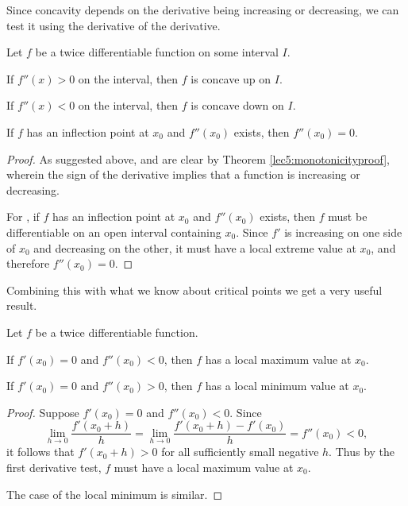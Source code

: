 \noindent
Since concavity depends on the derivative being increasing or decreasing, we can test it using the derivative of the derivative.

\begin{theorem}
	Let $f$ be a twice differentiable function on some interval $I$.
	\begin{romanlist}
		\item If $f''(x) > 0$ on the interval, then $f$ is concave up on $I$.
		\item If $f''(x) < 0$ on the interval, then $f$ is concave down on $I$.
		\item If $f$ has an inflection point at $x_0$ and $f''(x_0)$ exists, then $f''(x_0) = 0$.
	\end{romanlist}
\end{theorem}

\begin{proof}
	As suggested above,  and  are clear by Theorem \ref{lec5:monotonicityproof}, wherein the sign of the derivative implies that a function is increasing or decreasing.

	For , if $f$ has an inflection point at $x_0$ and $f''(x_0)$ exists, then $f$ must be differentiable on an open interval containing $x_0$. Since $f'$ is increasing on one side of $x_0$ and decreasing on the other, it must have a local extreme value at $x_0$, and therefore $f''(x_0) = 0$.
\end{proof}

\noindent
Combining this with what we know about critical points we get a very useful result.

\begin{theorem}
	Let $f$ be a twice differentiable function.

	\begin{romanlist}
		\item If $f'(x_0) = 0$ and $f''(x_0) < 0$, then $f$ has a local maximum value at $x_0$.
		\item If $f'(x_0) = 0$ and $f''(x_0) > 0$, then $f$ has a local minimum value at $x_0$.
	\end{romanlist}
\end{theorem}

\begin{proof}
	Suppose $f'(x_0) = 0$ and $f''(x_0) < 0$. Since
	\[
		\lim_{h \to 0} \frac{f'(x_0 + h)}{h} = \lim_{h \to 0} \frac{f'(x_0 + h) - f'(x_0)}{h} = f''(x_0) < 0,
	\]
	it follows that $f'(x_0 + h) > 0$ for all sufficiently small negative $h$. Thus by the first derivative test, $f$ must have a local maximum value at $x_0$.

	The case of the local minimum is similar.
\end{proof}

